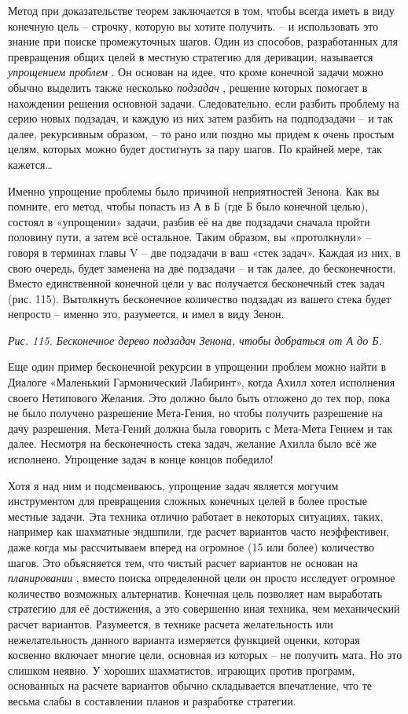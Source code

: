 \documentclass[../main.tex]{subfiles}
\begin{document}
Метод при доказательстве теорем заключается в том, чтобы всегда иметь в виду конечную цель \--- строчку, которую вы хотите получить. \--- и использовать это знание при поиске промежуточных шагов. Один из способов, разработанных для превращения общих целей в местную стратегию для деривации, называется \emph{упрощением проблем} . Он основан на идее, что кроме конечной задачи можно обычно выделить также несколько \emph{подзадач} , решение которых помогает в нахождении решения основной задачи. Следовательно, если разбить проблему на серию новых подзадач, и каждую из них затем разбить на подподзадачи \--- и так далее, рекурсивным образом, \--- то рано или поздно мы придем к очень простым целям, которых можно будет достигнуть за пару шагов. По крайней мере, так кажется\ldots{}

Именно упрощение проблемы было причиной неприятностей Зенона. Как вы помните, его метод, чтобы попасть из А в Б (где Б было конечной целью), состоял в «упрощении» задачи, разбив её на две подзадачи сначала пройти половину пути, а затем всё остальное. Таким образом, вы «протолкнули» \--- говоря в терминах главы V \--- две подзадачи в ваш «стек задач». Каждая из них, в свою очередь, будет заменена на две подзадачи \--- и так далее, до бесконечности. Вместо единственной конечной цели у вас получается бесконечный стек задач (рис. 115). Вытолкнуть бесконечное количество подзадач из вашего стека будет непросто \--- именно это, разумеется, и имел в виду Зенон.

\emph{Рис. 115. Бесконечное дерево подзадач Зенона, чтобы добраться от А до Б.}

Еще один пример бесконечной рекурсии в упрощении проблем можно найти в Диалоге «Маленький Гармонический Лабиринт», когда Ахилл хотел исполнения своего Нетипового Желания. Это должно было быть отложено до тех пор, пока не было получено разрешение Мета-Гения, но чтобы получить разрешение на дачу разрешения, Мета-Гений должна была говорить с Мета-Мета Гением и так далее. Несмотря на бесконечность стека задач, желание Ахилла было всё же исполнено. Упрощение задач в конце концов победило!

Хотя я над ним и подсмеиваюсь, упрощение задач является могучим инструментом для превращения сложных конечных целей в более простые местные задачи. Эта техника отлично работает в некоторых ситуациях, таких, например как шахматные эндшпили, где расчет вариантов часто неэффективен, даже когда мы рассчитываем вперед на огромное (15 или более) количество шагов. Это объясняется тем, что чистый расчет вариантов не основан на \emph{планировании} , вместо поиска определенной цели он просто исследует огромное количество возможных альтернатив. Конечная цель позволяет нам выработать стратегию для её достижения, а это совершенно иная техника, чем механический расчет вариантов. Разумеется, в технике расчета желательность или нежелательность данного варианта измеряется функцией оценки, которая косвенно включает многие цели, основная из которых \--- не получить мата. Но это слишком неявно. У хороших шахматистов, играющих против программ, основанных на расчете вариантов обычно складывается впечатление, что те весьма слабы в составлении планов и разработке стратегии.
\end{document}

